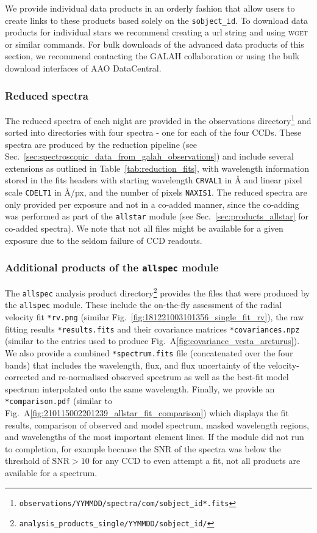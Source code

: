 \documentclass[
  journal=pasa,
  manuscript=research-paper, %
  year=2024,
  volume=37
]{cup-journal}
\begin{document}
We provide individual data products in an orderly fashion that allow users to create links to these products based solely on the \texttt{sobject\_id}. To download data products for individual stars we recommend creating a url string and using \textsc{wget} or similar commands. For bulk downloads of the advanced data products of this section, we recommend contacting the GALAH collaboration or using the bulk download interfaces of AAO DataCentral.

\subsubsection{Reduced spectra} \label{sec:reduced_spectra}

The reduced spectra of each night are provided in the observations directory\footnote{\texttt{observations/YYMMDD/spectra/com/sobject\_id*.fits}} and sorted into directories with four spectra - one for each of the four CCDs. These spectra are produced by the reduction pipeline (see Sec.~\ref{sec:spectroscopic_data_from_galah_observations}) and include several extensions as outlined in Table~\ref{tab:reduction_fits}, with wavelength information stored in the fits headers with starting wavelength \texttt{CRVAL1} in \AA\xspace and linear pixel scale \texttt{CDELT1} in \AA/px, and the number of pixels \texttt{NAXIS1}. The reduced spectra are only provided per exposure and not in a co-added manner, since the co-adding was performed as part of the \texttt{allstar} module (see Sec.~\ref{sec:products_allstar} for co-added spectra). We note that not all files might be available for a given exposure due to the seldom failure of CCD readouts.

\subsubsection{Additional products of the \texttt{allspec} module} \label{sec:products_allspec}

The \texttt{allspec} analysis product directory\footnote{\texttt{analysis\_products\_single/YYMMDD/sobject\_id/}} provides the files that were produced by the \texttt{allspec} module. These include the on-the-fly assessment of the radial velocity fit \texttt{*rv.png} (similar Fig.~\ref{fig:181221003101356_single_fit_rv}), the raw fitting results \texttt{*results.fits} and their covariance matrices \texttt{*covariances.npz} (similar to the entries used to produce Fig.~A\ref{fig:covariance_vesta_arcturus}). We also provide a combined \texttt{*spectrum.fits} file (concatenated over the four bands) that includes the wavelength, flux, and flux uncertainty of the velocity-corrected and re-normalised observed spectrum as well as the best-fit model spectrum interpolated onto the same wavelength. Finally, we provide an \texttt{*comparison.pdf} (similar to Fig.~A\ref{fig:210115002201239_allstar_fit_comparison}) which displays the fit results, comparison of observed and model spectrum, masked wavelength regions, and wavelengths of the most important element lines. If the module did not run to completion, for example because the SNR of the spectra was below the threshold of $\mathrm{SNR} > 10$ for any CCD to even attempt a fit, not all products are available for a spectrum.
\end{document}
